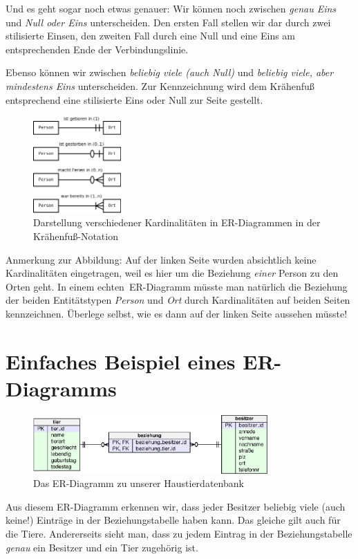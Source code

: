 Und es geht sogar noch etwas genauer: Wir können noch zwischen \textit{genau
Eins} und \textit{Null oder Eins} unterscheiden. Den ersten Fall stellen wir
dar durch zwei stilisierte Einsen, den zweiten Fall durch eine Null und eine
Eins am entsprechenden Ende der Verbindungslinie.

Ebenso können wir zwischen \textit{beliebig viele (auch Null)} und
\textit{beliebig viele, aber mindestens Eins} unterscheiden. Zur Kennzeichnung
wird dem Krähenfuß entsprechend eine stilisierte Eins oder Null zur Seite
gestellt.

\begin{figure}[h]
  \centering
   \includegraphics[clip,width=0.3\textwidth]{./inf/SEKII/34_SQL_ER-Diagramme/Kardinalitaeten.png}
   \caption{Darstellung verschiedener Kardinalitäten in ER-Diagrammen in der
   Krähenfuß-Notation}
   \label{fig:kardinalitäten}
\end{figure}

Anmerkung zur Abbildung: Auf der linken Seite wurden absichtlich keine
Kardinalitäten eingetragen, weil es hier um die Beziehung \emph{einer} Person
zu den Orten geht. In einem \glqq echten\grqq\ ER-Diagramm müsste man natürlich
die Beziehung der beiden Entitätstypen \emph{Person} und \emph{Ort} durch
Kardinalitäten auf beiden Seiten kennzeichnen. Überlege selbst, wie es dann auf
der linken Seite aussehen müsste!



\section{Einfaches Beispiel eines ER-Diagramms}

\begin{figure}[h]
  \centering
   \includegraphics[clip,width=0.8\textwidth]{./inf/SEKII/34_SQL_ER-Diagramme/ermHaustier}
   \caption{Das ER-Diagramm zu unserer Haustierdatenbank}
   \label{fig:erstes-er-diagramm}
\end{figure}

Aus diesem ER-Diagramm erkennen wir, dass jeder Besitzer beliebig viele (auch
keine!) Einträge in der Beziehungstabelle haben kann. Das gleiche gilt auch für
die Tiere. Andererseits sieht man, dass zu jedem Eintrag in der
Beziehungstabelle \textit{genau} ein Besitzer und ein Tier zugehörig ist.

%
